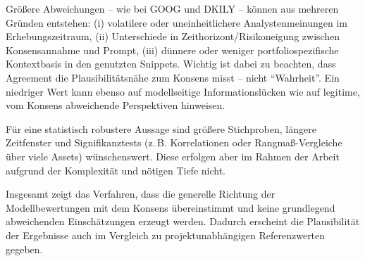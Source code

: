       Größere Abweichungen -- wie bei GOOG und DKILY -- können aus mehreren Gründen entstehen:
      (i) volatilere oder uneinheitlichere Analystenmeinungen im Erhebungszeitraum,
      (ii) Unterschiede in Zeithorizont/Risikoneigung zwischen Konsensannahme und Prompt,
      (iii) dünnere oder weniger portfoliospezifische Kontextbasis in den genutzten Snippets.
      Wichtig ist dabei zu beachten, dass Agreement die Plausibilitätsnähe zum Konsens misst -- nicht \enquote{Wahrheit}.
      Ein niedriger Wert kann ebenso auf modellseitige Informationslücken wie auf legitime, vom Konsens abweichende Perspektiven hinweisen.

      Für eine statistisch robustere Aussage sind größere Stichproben, längere Zeitfenster und Signifikanztests (z.\,B. Korrelationen oder Rangmaß-Vergleiche über viele Assets) wünschenswert.
      Diese erfolgen aber im Rahmen der Arbeit aufgrund der Komplexität und nötigen Tiefe nicht.

      Insgesamt zeigt das Verfahren, dass die generelle Richtung der Modellbewertungen mit dem Konsens übereinstimmt und keine grundlegend abweichenden Einschätzungen erzeugt werden.
      Dadurch erscheint die Plausibilität der Ergebnisse auch im Vergleich zu projektunabhängigen Referenzwerten gegeben.

